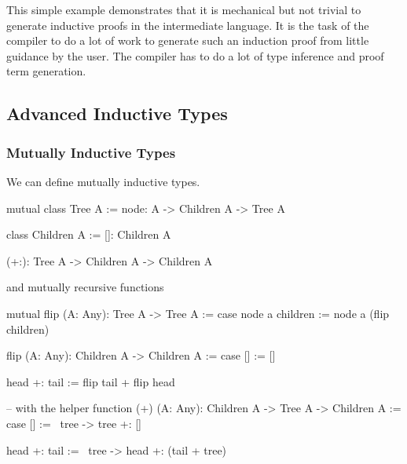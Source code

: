 This simple example demonstrates that it is mechanical but not trivial to
generate inductive proofs in the intermediate language. It is the task of the
compiler to do a lot of work to generate such an induction proof from little
guidance by the user. The compiler has to do a lot of type inference and proof
term generation.







\subsection{Advanced Inductive Types}
\label{sec:advanced-inductive-types}



\subsubsection{Mutually Inductive Types}

We can define mutually inductive types.

\begin{alba}
    mutual
        class
            Tree A
        :=
            node: A -> Children A -> Tree A

        class
            Children A
        :=
            []: Children A

            (+:): Tree A -> Children A -> Children A
\end{alba}
%
and mutually recursive functions

\begin{alba}
    mutual
        flip (A: Any): Tree A -> Tree A
        :=
            case
                node a children :=
                    node a (flip children)

        flip (A: Any): Children A -> Children A
        :=
            case
                [] :=
                    []

                head +: tail :=
                    flip tail + flip head

    -- with the helper function
    (+) (A: Any): Children A -> Tree A -> Children A
    :=
        case
            [] :=
                \ tree -> tree +: []

            head +: tail :=
                \ tree ->
                    head +: (tail + tree)


\end{alba}






